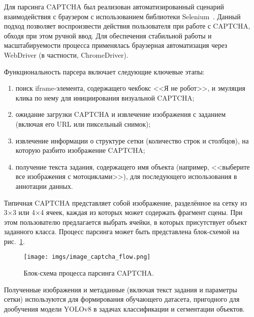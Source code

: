 Для парсинга CAPTCHA был реализован автоматизированный сценарий взаимодействия с браузером с использованием библиотеки Selenium~\cite{Selenium}. Данный подход позволяет воспроизвести действия пользователя при работе с CAPTCHA, обходя при этом ручной ввод. Для обеспечения стабильной работы и масштабируемости процесса применялась браузерная автоматизация через WebDriver (в частности, ChromeDriver).

Функциональность парсера включает следующие ключевые этапы:

\begin{enumerate}
    \item поиск iframe-элемента, содержащего чекбокс <<Я не робот>>, и эмуляция клика по нему для инициирования визуальной CAPTCHA;
    \item ожидание загрузки CAPTCHA и извлечение изображения с заданием (включая его URL или пиксельный снимок);
    \item извлечение информации о структуре сетки (количество строк и столбцов), на которую разбито изображение CAPTCHA;
    \item получение текста задания, содержащего имя объекта (например, <<выберите все изображения с мотоциклами>>), для последующего использования в аннотации данных.
\end{enumerate}

Типичная CAPTCHA представляет собой изображение, разделённое на сетку из 3×3 или 4×4 ячеек, каждая из которых может содержать фрагмент сцены. При этом пользователю предлагается выбрать ячейки, в которых присутствует объект заданного класса. Процесс парсинга может быть представлена блок-схемой на рис.~\ref{fig:captcha-flow}.

\begin{figure}[H]
    \centering
    \texttt{[image: imgs/image\_captcha\_flow.png]}
    \caption{Блок-схема процесса парсинга CAPTCHA.}
    \label{fig:captcha-flow}
\end{figure}
\vspace{-0.5cm}

Полученные изображения и метаданные (включая текст задания и параметры сетки) используются для формирования обучающего датасета, пригодного для дообучения модели YOLOv8 в задачах классификации и сегментации объектов.
